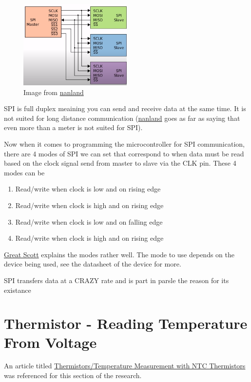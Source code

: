 \documentclass{article}
\begin{document}
	\begin{figure}[H]
	\centering
	\includegraphics[width=0.5\textwidth]{images/multi_slave.png}
	\caption{Image from \href{https://www.youtube.com/watch?v=ba0SQwjTQfw}{nanland}}	
	\end{figure}

	SPI is full duplex meaining you can send and receive data at the same time. It is not suited for long distance communication (\href{https://www.youtube.com/watch?v=ba0SQwjTQfw}{nanland} goes as far as saying that even more than a meter is not suited for SPI).

	Now when it comes to programming the microcontroller for SPI communication, there are 4 modes of SPI we can set that correspond to when data must be read based on the clock signal send from master to slave via the CLK pin. These 4 modes can be 
	\begin{enumerate}
		\item Read/write when clock is low and on rising edge
		\item Read/write when clock is high and on rising edge
		\item Read/write when clock is low and on falling edge
		\item Read/write when clock is high and on rising edge
	\end{enumerate}

	\href{https://www.youtube.com/watch?v=fvOAbDMzoks&t=6s}{Great Scott} explains the modes rather well. The mode to use depends on the device being used, see the datasheet of the device for more.

	SPI transfers data at a CRAZY rate and is part in parsle the reason for its existance
	

	\section{Thermistor - Reading Temperature From Voltage} %
	\label{sec:thermistor_reading_temperature_from_voltage}
	An article titled \href{https://www.jameco.com/Jameco/workshop/techtip/temperature-measurement-ntc-thermistors.html#:~:text=Thermistor%20Response%20to%20Temperature,in%20response%20to%20temperature%20change.}{Thermistors/Temperature Measurement with NTC Thermistors} was referenced for this section of the research.
	
\end{document}

